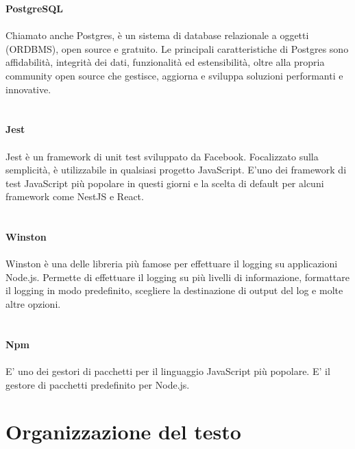 \textbf{PostgreSQL}
\\\\
Chiamato anche Postgres, è un sistema di database relazionale a oggetti (ORDBMS), open source e 
gratuito.
Le principali caratteristiche di Postgres sono affidabilità, integrità dei dati, funzionalità ed estensibilità, 
oltre alla propria community open source che gestisce, aggiorna e sviluppa soluzioni performanti e innovative.
\\\\\\
\textbf{Jest}
\\\\
Jest è un framework di unit test sviluppato da Facebook. Focalizzato sulla semplicità, è utilizzabile in qualsiasi
progetto JavaScript. E'uno dei framework di test JavaScript più popolare in questi giorni e la scelta di default 
per alcuni framework come NestJS e React.
\\\\\\
\textbf{Winston}
\\\\
Winston è una delle libreria più famose per effettuare il logging su applicazioni Node.js. Permette di effettuare il logging
su più livelli di informazione, formattare il logging in modo predefinito, scegliere la destinazione di output del log e molte 
altre opzioni.
\\\\\\
\textbf{Npm}
\\\\
E' uno dei gestori di pacchetti per il linguaggio JavaScript più popolare. E' il gestore di pacchetti predefinito 
per Node.js.

\section{Organizzazione del testo}


